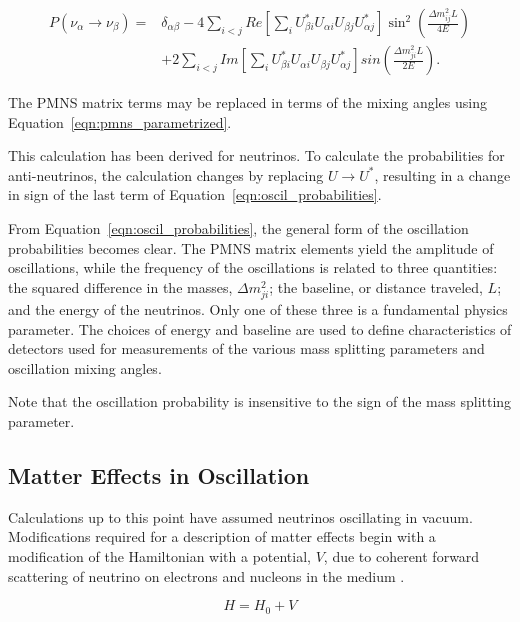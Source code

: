 \begin{equation}
\begin{aligned}
P\left(\nu_\alpha\rightarrow\nu_\beta\right) ={} &	 \delta_{\alpha \beta} -  4 \sum_{i<j} Re\left[ \sum_i U^*_{\beta i} U_{\alpha i}  U_{\beta j} U^*_{\alpha j} \right] \sin^2\left(\frac{\Delta m_{ij}^2 L}{4E}\right) \\
	& + 2 \sum_{i<j} Im\left[ \sum_i U^*_{\beta i} U_{\alpha i}  U_{\beta j} U^*_{\alpha j} \right] sin\left(\frac{\Delta m_{ji}^2 L}{2E}\right).
\end{aligned}
\label{eqn:oscil_probabilities}
\end{equation}

The PMNS matrix terms may be replaced in terms of the mixing angles using Equation~\ref{eqn:pmns_parametrized}.

This calculation has been derived for neutrinos.
To calculate the probabilities for anti-neutrinos, the calculation changes by replacing ${U \rightarrow U^*}$, resulting in a change in sign of the last term of Equation~\ref{eqn:oscil_probabilities}.

From Equation~\ref{eqn:oscil_probabilities}, the general form of the oscillation probabilities becomes clear. 
The PMNS matrix elements yield the amplitude of oscillations, while the frequency of the oscillations is related to three quantities: the squared difference in the masses, ${\Delta m^2_{ji}}$; the baseline, or distance traveled, ${L}$; and the energy of the neutrinos.
Only one of these three is a fundamental physics parameter.
The choices of energy and baseline are used to define characteristics of detectors used for measurements of the various mass splitting parameters and oscillation mixing angles.

Note that the oscillation probability is insensitive to the sign of the mass splitting parameter.

\subsection{Matter Effects in Oscillation}
\label{subsec:msw}
Calculations up to this point have assumed neutrinos oscillating in vacuum.
Modifications required for a description of matter effects begin with a modification of the Hamiltonian with a potential, ${V}$, due to coherent forward scattering of neutrino on electrons and nucleons in the medium \cite{Review-MSW}.

\begin{equation}
H = H_0 + V
\end{equation}

